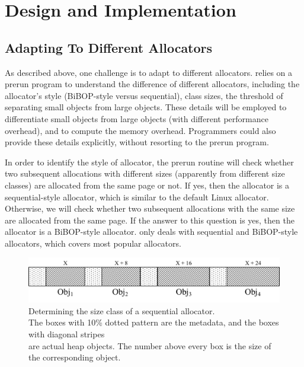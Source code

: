 \section{Design and Implementation}
\label{sec:implementation}

\subsection{Adapting To Different Allocators}

\label{sec:understandingallocators}

As described above, one challenge is to adapt \MP{} to different allocators. \MP{} relies on a prerun program to understand the difference of different allocators, including the allocator's style (BiBOP-style versus sequential), class sizes, the threshold of separating small objects from large objects. These details will be employed to differentiate small objects from large objects (with different performance overhead), and to compute the memory overhead. Programmers could also provide these details explicitly, without resorting to the prerun program.  

In order to identify the style of allocator, the prerun routine will check whether two subsequent allocations with different sizes (apparently from different size classes) are allocated from the same page or not. If yes, then the allocator is a sequential-style allocator, which is similar to the default Linux allocator. Otherwise, we will check whether two subsequent allocations with the same size are allocated from the same page. If the answer to this question is yes, then the allocator is a BiBOP-style allocator. \MP{} only deals with sequential and BiBOP-style allocators, which covers most popular allocators.  

\begin{figure}[!ht]
\centering
\includegraphics[width=5in]{figures/sequentialclasssize}
\caption{Determining the size class of a sequential allocator. \\The boxes with 10\% dotted pattern are the metadata, and the boxes with diagonal stripes\\ are actual heap objects. The number above every box is the size of the corresponding object. \label{fig:sizeclass}}
\end{figure}

